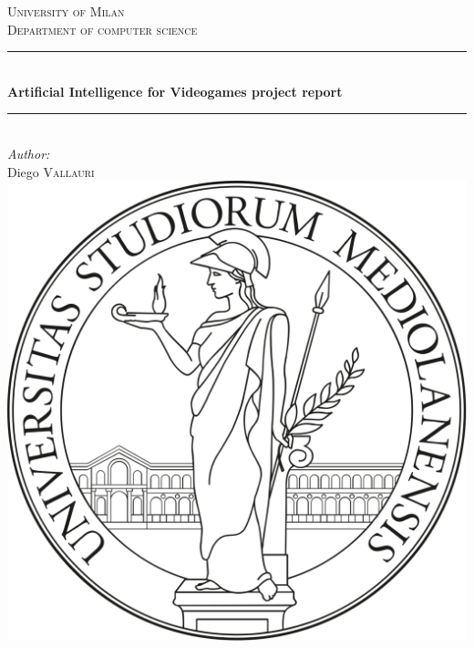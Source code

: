 \documentclass[12pt]{article}
\begin{document}
	
	\begin{titlepage}
		
		\newcommand{\HRule}{\rule{\linewidth}{0.5mm}} %
		\center 
		
		
		\textsc{\LARGE University of Milan}\\[0.5cm]
		\textsc{\Large Department of computer science}\\[0.5cm] 
		
		\HRule \\[0.4cm]
		{ \huge \bfseries Artificial Intelligence for Videogames project report}\\[0.4cm] %
		\HRule \\[1.5cm]
		
		
		\Large \emph{Author:}\\
		Diego \textsc{Vallauri}\\[2cm]
		
		
		\includegraphics[scale=0.2]{images/logo.png}\\[1cm] 
		

\end{titlepage}
\end{document}
